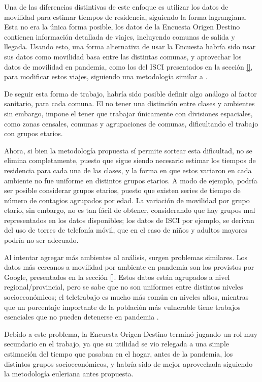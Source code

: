 
Una de las diferencias distintivas de este enfoque es utilizar los datos de movilidad para estimar tiempos de residencia, siguiendo la forma lagrangiana. Esta no era la única forma posible, los datos de la Encuesta Origen Destino contienen información detallada de viajes, incluyendo comunas de salida y llegada. Usando esto, una forma alternativa de usar la Encuesta habría sido usar sus datos como movilidad basa entre las distintas comunas, y aprovechar los datos de movilidad en pandemia, como los del ISCI presentados en la sección \ref{}, para modificar estos viajes, siguiendo una metodología similar a \cite{Lai2020}.


De seguir esta forma de trabajo, habría sido posible definir algo análogo al factor sanitario, para cada comuna. El no tener una distinción entre clases y ambientes sin embargo, impone el tener que trabajar únicamente con divisiones espaciales, como zonas censales, comunas y agrupaciones de comunas, dificultando el trabajo con grupos etarios.

Ahora, si bien la metodología propuesta sí permite sortear esta dificultad, no se elimina completamente, puesto que sigue siendo necesario estimar los tiempos de residencia para cada una de las clases, y la forma en que estos variaron en cada ambiente no fue uniforme en distintos grupos etarios. A modo de ejemplo, podría ser posible considerar grupos etarios, puesto que existen series de tiempo de número de contagios agrupados por edad. La variación de movilidad por grupo etario, sin embargo, no es tan fácil de obtener, considerando que hay grupos mal representados en los datos disponibles; los datos de ISCI por ejemplo, se derivan del uso de torres de telefonía móvil, que en el caso de niños y adultos mayores podría no ser adecuado.

Al intentar agregar más ambientes al análisis, surgen problemas similares. Los datos más cercanos a movilidad por ambiente en pandemia son los provistos por Google, presentados en la sección \ref{}. Estos datos están agrupados a nivel regional/provincial, pero se sabe \cite{Olivares2020} que no son uniformes entre distintos niveles socioeconómicos; el teletrabajo es mucho más común en niveles altos, mientras que un porcentaje importante de la población más vulnerable tiene trabajos esenciales que no pueden detenerse en pandemia \cite{}.

Debido a este problema, la Encuesta Origen Destino terminó jugando un rol muy secundario en el trabajo, ya que su utilidad se vio relegada a una simple estimación del tiempo que pasaban en el hogar, antes de la pandemia, los distintos grupos socioeconómicos, y habría sido de mejor aprovechada siguiendo la metodología euleriana antes propuesta. 

